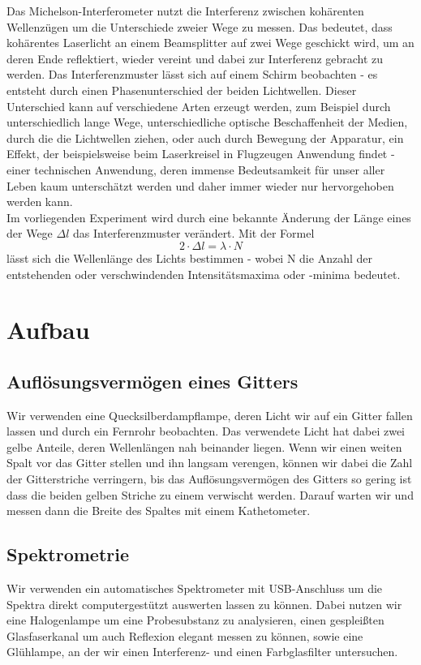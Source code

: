 \documentclass{article}
\begin{document}
Das Michelson-Interferometer nutzt die Interferenz zwischen kohärenten Wellenzügen um die Unterschiede zweier Wege zu messen. Das bedeutet, dass kohärentes Laserlicht an einem Beamsplitter auf zwei Wege geschickt wird, um an deren Ende reflektiert, wieder vereint und dabei zur Interferenz gebracht zu werden. Das Interferenzmuster lässt sich auf einem Schirm beobachten - es entsteht durch einen Phasenunterschied der beiden Lichtwellen. Dieser Unterschied kann auf verschiedene Arten erzeugt werden, zum Beispiel durch unterschiedlich lange Wege, unterschiedliche optische Beschaffenheit der Medien, durch die die Lichtwellen ziehen, oder auch durch Bewegung der Apparatur, ein Effekt, der beispielsweise beim Laserkreisel in Flugzeugen Anwendung findet - einer technischen Anwendung, deren immense Bedeutsamkeit für unser aller Leben kaum unterschätzt werden und daher immer wieder nur hervorgehoben werden kann.\\
Im vorliegenden Experiment wird durch eine bekannte Änderung der Länge eines der Wege $\Delta l$ das Interferenzmuster verändert. Mit der Formel 
\begin{equation}
\label{equ:Michelson}
2\cdot \Delta l= \lambda \cdot N
\end{equation}
lässt sich die Wellenlänge des Lichts bestimmen - wobei N die Anzahl der entstehenden oder verschwindenden Intensitätsmaxima oder -minima bedeutet. 
\section{Aufbau}
\subsection{Auflösungsvermögen eines Gitters}
Wir verwenden eine Quecksilberdampflampe, deren Licht wir auf ein Gitter fallen lassen und durch ein Fernrohr beobachten. Das verwendete Licht hat dabei zwei gelbe Anteile, deren Wellenlängen nah beinander liegen. Wenn wir einen weiten Spalt vor das Gitter stellen und ihn langsam verengen, können wir dabei die Zahl der Gitterstriche verringern, bis das Auflösungsvermögen des Gitters so gering ist dass die beiden gelben Striche zu einem verwischt werden. Darauf warten wir und messen dann die Breite des Spaltes mit einem Kathetometer.
\subsection{Spektrometrie}
Wir verwenden ein automatisches Spektrometer mit USB-Anschluss um die Spektra direkt computergestützt auswerten lassen zu können. Dabei nutzen wir eine Halogenlampe um eine Probesubstanz zu analysieren, einen gespleißten Glasfaserkanal um auch Reflexion elegant messen zu können, sowie eine Glühlampe, an der wir einen Interferenz- und einen Farbglasfilter untersuchen.
\end{document}
